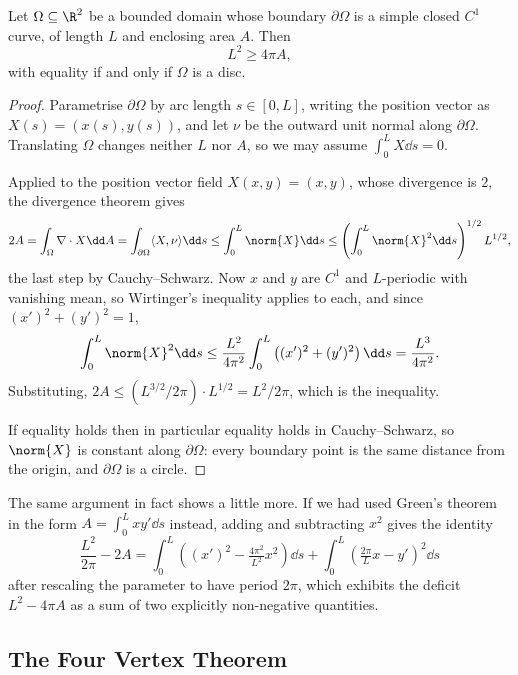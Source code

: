 \begin{theorem}
    Let $\Omega \subseteq \R^2$ be a bounded domain whose boundary $\partial\Omega$ is a simple closed $C^1$ curve, of length $L$ and enclosing area $A$. Then
    $$
    L^2 \geq 4\pi A,
    $$
    with equality if and only if $\Omega$ is a disc.
\end{theorem}
\begin{proof}
    Parametrise $\partial\Omega$ by arc length $s \in [0, L]$, writing the position vector as $X(s) = (x(s), y(s))$, and let $\nu$ be the outward unit normal along $\partial\Omega$. Translating $\Omega$ changes neither $L$ nor $A$, so we may assume $\int_0^L X \dd s = 0$.

    Applied to the position vector field $X(x,y) = (x,y)$, whose divergence is $2$, the divergence theorem gives
    $$
    2A = \int_\Omega \nabla \cdot X \dd A = \int_{\partial\Omega} \langle X, \nu\rangle \dd s \leq \int_0^L \norm{X}\dd s \leq \left(\int_0^L \norm{X}^2 \dd s\right)^{1/2}L^{1/2},
    $$
    the last step by Cauchy--Schwarz. Now $x$ and $y$ are $C^1$ and $L$-periodic with vanishing mean, so Wirtinger's inequality applies to each, and since $(x')^2 + (y')^2 = 1$,
    $$
    \int_0^L \norm{X}^2 \dd s \leq \frac{L^2}{4\pi^2}\int_0^L \left((x')^2 + (y')^2\right)\dd s = \frac{L^3}{4\pi^2}.
    $$
    Substituting, $2A \leq (L^{3/2}/2\pi)\cdot L^{1/2} = L^2/2\pi$, which is the inequality.

    If equality holds then in particular equality holds in Cauchy--Schwarz, so $\norm{X}$ is constant along $\partial\Omega$: every boundary point is the same distance from the origin, and $\partial\Omega$ is a circle.
\end{proof}

\begin{remark}
    The same argument in fact shows a little more. If we had used Green's theorem in the form $A = \int_0^L x y' \dd s$ instead, adding and subtracting $x^2$ gives the identity
    $$
    \frac{L^2}{2\pi} - 2A = \int_0^{L}\left((x')^2 - \tfrac{4\pi^2}{L^2}x^2\right)\dd s + \int_0^{L}\left(\tfrac{2\pi}{L}x - y'\right)^2\dd s
    $$
    after rescaling the parameter to have period $2\pi$, which exhibits the deficit $L^2 - 4\pi A$ as a sum of two explicitly non-negative quantities.
\end{remark}

\subsection{The Four Vertex Theorem}

